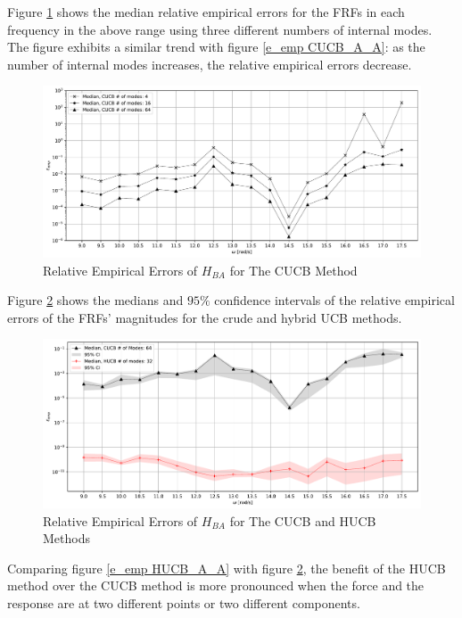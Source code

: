 Figure \ref{e_emp CUCB_B_A} shows the median relative empirical errors for the FRFs in each frequency in the above range using three different numbers of internal modes.
The figure exhibits a similar trend with figure \ref{e_emp CUCB_A_A}: as the number of internal modes increases, the relative empirical errors decrease.
\begin{figure}[H]
    \centering
    \includegraphics[width=1.0\textwidth]{
        plots/substructuring/plot_9.pdf
    }
    \caption{%
        Relative Empirical Errors of $H_{BA}$ for The CUCB Method
    }
    \label{e_emp CUCB_B_A}
\end{figure}

Figure \ref{e_emp HUCB_B_A} shows the medians and $95\%$ confidence intervals of the relative empirical errors of the FRFs' magnitudes for the crude and hybrid UCB methods.
\begin{figure}[H]
    \centering
    \includegraphics[width=1.0\textwidth]{
        plots/substructuring/plot_10.pdf
    }
    \caption{%
        Relative Empirical Errors of $H_{BA}$ for The CUCB and HUCB Methods
    }
    \label{e_emp HUCB_B_A}
\end{figure}
Comparing figure \ref{e_emp HUCB_A_A} with figure \ref{e_emp HUCB_B_A}, the benefit of the HUCB method over the CUCB method is more pronounced when the force and the response are at two different points or two different components.

